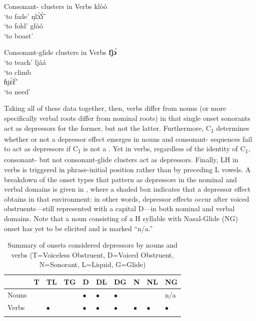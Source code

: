\documentclass[output=paper,newtxmath,modfonts,nonflat]{langsci/langscibook}
\begin{document}
\ea\label{ex:lotven:9}Consonant- clusters in  Verbs
\ea\label{ex:lotven:9a}
    klòó\\
    \glt ‘to fade’
\ex\label{ex:lotven:9b}
	ŋlɔ̃̀ɔ̃́\\
    \glt ‘to fold’
\ex\label{ex:lotven:9c}
	glòó\\
    \glt ‘to boast’
\z
\z

\ea\label{ex:lotven:10}Consonant-glide clusters in  Verbs
\ea\label{ex:lotven:10a}
    \textbf{fjɔ́}\\
    \glt ‘to teach’
\ex\label{ex:lotven:10b}
	ljàá\\
    \glt ‘to climb\\
\ex\label{ex:lotven:10c}
	ɦjɛ̃̀ɛ̃́\\
    \glt ‘to need’
\z
\z
        

Taking all of these data together, then, verbs differ from nouns (or more specifically verbal roots differ from nominal roots) in that single onset sonorants act as depressors for the former, but not the latter. Furthermore, C\textsubscript{1} determines whether or not a depressor effect emerges in nouns and consonant- sequences fail to act as depressors if C\textsubscript{1} is not a . Yet in verbs, regardless of the identity of C\textsubscript{1}, consonant- but not consonant-glide clusters act as depressors. Finally, LH  in verbs is triggered in phrase-initial position rather than by preceding L  vowels. A breakdown of the onset types that pattern as depressors in the nominal and verbal domains is given in 
, where a shaded box indicates that a depressor effect obtains in that environment: in other words, depressor effects occur after voiced obstruents—still represented with a capital D—in both nominal and verbal domains. Note that a noun consisting of a H  syllable with Nasal-Glide (NG) onset has yet to be elicited and is marked “n/a.”

\begin{table}
\begin{tabularx}{\textwidth}{Xlllllllll}
\lsptoprule
& {T} & {TL} & {TG} & {D} & {DL} & {DG} & {N} & {NL} & {NG}\\
\midrule
Nouns &  &  &  & $\bullet$ & $\bullet$ & $\bullet$ &  &  & n/a\\
Verbs &  & $\bullet$ &  & $\bullet$ & $\bullet$ & $\bullet$ & $\bullet$ & $\bullet$ & $\bullet$ \\
\lspbottomrule
\end{tabularx}
\caption{Summary of onsets considered depressors by nouns and verbs (T=Voiceless Obstruent, D=Voiced Obstruent, N=Sonorant, L=Liquid, G=Glide)}
\label{fig:lotven:6}
\end{table}
\end{document}
